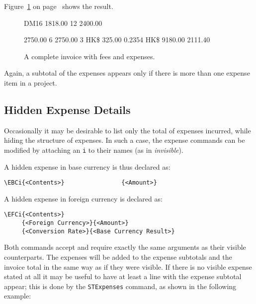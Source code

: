 \documentclass[11pt]{ltxdoc}
\begin{document}
Figure~\ref{full_invoice} on
page~\pageref{full_invoice}
shows the result.

\begin{figure}[h]
\begin{invoice}{DM}{16}
			{1818.00}	{12}
       		{2400.00}

          {2750.00}   { 6}
           {2750.00}   { 3}
        {HK\$}  {325.00} {0.2354}   {}
              {HK\$}  {9180.00}   {} {2111.40}
\end{invoice}
\caption{A complete invoice with fees and expenses.\label{full_invoice}}
\end{figure}

Again, a subtotal of the expenses appears only if there is more than
one expense item in a project.


\subsection{Hidden Expense Details}

Occasionally it may be desirable to list only the total of expenses
incurred, while hiding the structure of expenses. In such a case,
the expense commands can be modified by attaching an \verb|i| to
their names (as in \textit{invisible}).

A hidden expense in base currency is thus declared as:

\begin{verbatim}
\EBCi{<Contents>}                {<Amount>}
\end{verbatim}

A hidden expense in foreign currency is declared as:

\begin{verbatim}
\EFCi{<Contents>}
     {<Foreign Currency>}{<Amount>}
     {<Conversion Rate>}{<Base Currency Result>}
\end{verbatim}

Both commands accept and require exactly the same arguments as their
visible counterparts. The expenses will be added to the expense subtotals
and the invoice total in the same way as if they were visible. If there
is no visible expense stated at all it may be useful to have at least 
a line with the expense subtotal appear; this is done by the \verb|STExpenses|
command, as shown in the following example:
\end{document}
